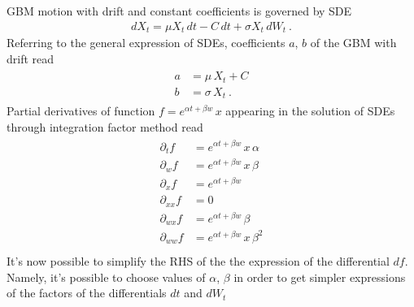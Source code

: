 \documentclass[letterpaper,10pt,english]{jupyterBook}
\begin{document}
\sphinxAtStartPar
GBM motion with drift and constant coefficients is governed by SDE
\begin{equation*}
\begin{split}d X_t = \mu X_t \, dt - C \, dt + \sigma X_t \, dW_t \ .\end{split}
\end{equation*}
\sphinxAtStartPar
Referring to the general expression of SDEs, coefficients \(a\), \(b\) of the GBM with drift read
\begin{equation*}
\begin{split}\begin{aligned}
  a & = \mu \, X_t + C \\
  b & = \sigma \, X_t \ .
\end{aligned}\end{split}
\end{equation*}
\sphinxAtStartPar
Partial derivatives of function \(f = e^{\alpha t + \beta w} \, x\) appearing in the solution of SDEs through integration factor method read
\begin{equation*}
\begin{split}\begin{aligned}
  \partial_t    f & = e^{\alpha t + \beta w} \, x \, \alpha   \\
  \partial_w    f & = e^{\alpha t + \beta w} \, x \, \beta    \\
  \partial_x    f & = e^{\alpha t + \beta w}                  \\
  \partial_{xx} f & = 0                                       \\
  \partial_{wx} f & = e^{\alpha t + \beta w}      \, \beta    \\
  \partial_{ww} f & = e^{\alpha t + \beta w} \, x \, \beta^2  \\
\end{aligned}\end{split}
\end{equation*}
\sphinxAtStartPar
It’s now possible to simplify the RHS of the the expression of the differential \(df\). Namely, it’s possible to choose values of \(\alpha\), \(\beta\) in order to get simpler expressions of the factors of the differentials \(dt\)  and \(d W_t\)
\end{document}
